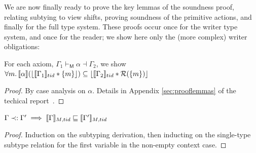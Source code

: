 We are now finally ready to prove the key lemmas of the soundness proof, relating subtying to view shifts, proving soundness of the primitive actions, and finally for the full type system.  These proofs occur once for the writer type system, and once for the reader; we show here only the (more complex) writer obligations:

\begin{lemma}
  \label{lem:axmsoundness}
For each axiom, $\Gamma_{1} \vdash_{\textsf{M}} \alpha \dashv \Gamma_{2}$, we show
$
\forall m\ldotp   \llbracket \alpha \rrbracket  (\lfloor \llbracket \Gamma_{1} \rrbracket_{tid}  * \{m\} \rfloor )\subseteq  \lfloor \llbracket \Gamma_{2} \rrbracket_{tid} * \mathcal{R}(\{m\}) \rfloor
$
\end{lemma}
\begin{proof}
By case analysis on $\alpha$. Details in Appendix \ref{sec:prooflemmas} of the techical report~\cite{isotek}. %
\end{proof}
\begin{lemma}\label{lem:cntxsubt-mcln}
$ \Gamma \prec: \Gamma'  \implies \llbracket \Gamma \rrbracket_{M,tid} \sqsubseteq \llbracket  \Gamma' \rrbracket_{M,tid} $
\end{lemma}
\begin{proof}
Induction on the subtyping derivation, then inducting on the single-type subtype relation for the first variable in the non-empty context case.
\end{proof}

